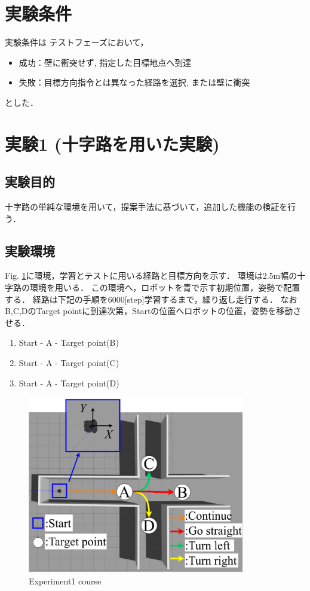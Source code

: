 \section{実験条件}
実験条件は
テストフェーズにおいて，
\begin{itemize}
  \item 成功：壁に衝突せず, 指定した目標地点へ到達
  \item 失敗：目標方向指令とは異なった経路を選択, または壁に衝突
\end{itemize}
とした．
\newpage
\section{実験1 (十字路を用いた実験)}
\subsection{実験目的}
十字路の単純な環境を用いて，提案手法に基づいて，追加した機能の検証を行う．
\subsection{実験環境}
Fig. \ref{fig::zyuzi}に環境，学習とテストに用いる経路と目標方向を示す．
環境は2.5m幅の十字路の環境を用いる．
この環境へ，ロボットを青で示す初期位置，姿勢で配置する．
経路は下記の手順を6000[step]学習するまで，繰り返し走行する．
なおB,C,DのTarget pointに到達次第，Startの位置へロボットの位置，姿勢を移動させる．
\begin{enumerate}
  \setlength{\parskip}{0cm} %
  \setlength{\itemsep}{0cm} %
  \item Start - A - Target point(B)
  \item Start - A - Target point(C)
  \item Start - A - Target point(D)
  \end{enumerate}

\begin{figure}[H]
    \centering
    \includegraphics[width = 9.5cm]{./figs/zyuziroute.pdf}
    \caption{Experiment1 course}
    \label{fig::zyuzi}
\end{figure}

